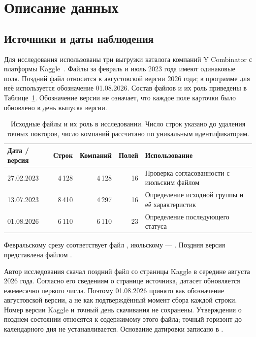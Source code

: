 \clearpage
\section{Описание данных}
\label{sec:data}

\subsection{Источники и даты наблюдения}

Для исследования использованы три выгрузки каталога компаний Y Combinator с платформы Kaggle~\cite{kaggle-yc-dataset1,kaggle-yc-dataset2}. Файлы за февраль и июль 2023 года имеют одинаковые поля. Поздний файл относится к августовской версии 2026 года; в программе для неё используется обозначение 01.08.2026. Состав файлов и их роль приведены в Таблице~\ref{tab:data-snapshots}. Обозначение версии не означает, что каждое поле карточки было обновлено в день выпуска версии.

\begin{table}[!htbp]
    \centering
    \small
    \caption{Исходные файлы и их роль в исследовании. Число строк указано до удаления точных повторов, число компаний рассчитано по уникальным идентификаторам.}
    \label{tab:data-snapshots}
    \begin{tabular}{@{}lrrr>{\raggedright\arraybackslash}p{5.7cm}@{}}
        \toprule
        Дата / версия & Строк & Компаний & Полей & Использование \\
        \midrule
        27.02.2023 & 4\,128 & 4\,128 & 16 & Проверка согласованности с июльским файлом \\
        13.07.2023 & 8\,410 & 4\,297 & 16 & Определение исходной группы и её характеристик \\
        01.08.2026 & 6\,110 & 6\,110 & 23 & Определение последующего статуса \\
        \bottomrule
    \end{tabular}
\end{table}

Февральскому срезу соответствует файл , июльскому --- . Поздняя версия представлена файлом .

Автор исследования скачал поздний файл со страницы Kaggle в середине августа 2026 года. Согласно его сведениям о странице источника, датасет обновляется ежемесячно первого числа. Поэтому 01.08.2026 принято как обозначение августовской версии, а не как подтверждённый момент сбора каждой строки. Номер версии Kaggle и точный день скачивания не сохранены. Утверждения о позднем состоянии относятся к содержимому этого файла; точный горизонт до календарного дня не устанавливается. Основание датировки записано в .

